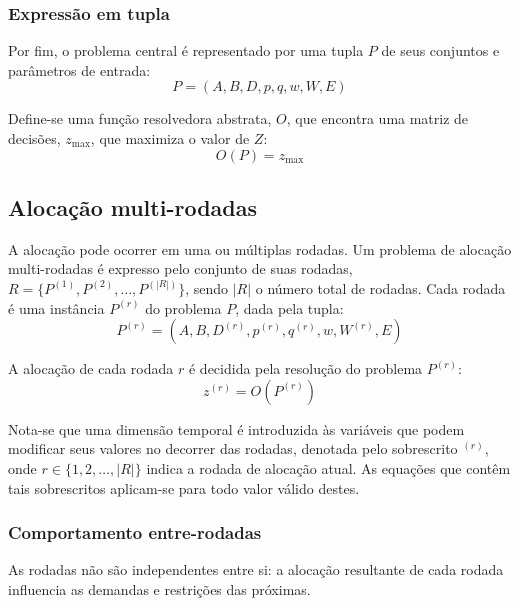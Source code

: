 \documentclass[
    12pt,
    openany,
    oneside,
    a4paper,
    english,
    brazil
]{abntex2}
\begin{document}
\subsubsection{Expressão em tupla}

Por fim, o problema central é representado por uma tupla $P$ de seus conjuntos e parâmetros de entrada:
\begin{equation}
P = (A, B, D, p, q, w, W, E)
\end{equation}

Define-se uma função resolvedora abstrata, $O$, que encontra uma matriz de decisões, $z_{\max}$, que maximiza o valor de $Z$:
\begin{equation}
O(P) = z_{\max}
\end{equation}

\subsection{Alocação multi-rodadas}
\label{sec:multi-rodadas}

A alocação pode ocorrer em uma ou múltiplas rodadas. Um problema de alocação multi-rodadas é expresso pelo conjunto de suas rodadas, $R = \{P^{(1)}, P^{(2)}, \dots, P^{(|R|)}\}$, sendo $|R|$ o número total de rodadas. Cada rodada é uma instância $P^{(r)}$ do problema $P$, dada pela tupla:
\begin{equation}
P^{(r)} = (A, B, D^{(r)}, p^{(r)}, q^{(r)}, w, W^{(r)}, E)
\end{equation}

A alocação de cada rodada $r$ é decidida pela resolução do problema $P^{(r)}$:
\begin{equation}
    z^{(r)} = O(P^{(r)})
\end{equation}

Nota-se que uma dimensão temporal é introduzida às variáveis que podem modificar seus valores no decorrer das rodadas, denotada pelo sobrescrito $^{(r)}$, onde $r \in \{1, 2, \dots, |R|\}$ indica a rodada de alocação atual. As equações que contêm tais sobrescritos aplicam-se para todo valor válido destes.

\subsubsection{Comportamento entre-rodadas}

As rodadas não são independentes entre si: a alocação resultante de cada rodada influencia as demandas e restrições das próximas.
\end{document}
